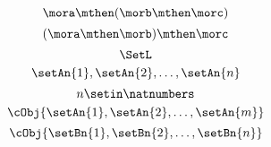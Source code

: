 \begin{forslides}
    \begin{equation}
        \label{eq:moore-assoc-a-bis}
        \mora \mthen (\morb \mthen \morc)
    \end{equation}
    \begin{equation}
        \label{eq:moore-assoc-b-bis}
        (\mora \mthen \morb) \mthen \morc
    \end{equation}
    \begin{equation}
        \label{eq:lset}
        \SetL
    \end{equation}
    \begin{equation}
        \label{eq:definition-setl}
        \setAn{1}, \setAn{2}, \ldots, \setAn{n}
    \end{equation}
    \begin{equation}
        \label{eq:definition-setlbis}
        n\setin \natnumbers
    \end{equation}
    \begin{equation}
        \label{eq:mult-setl}
        \cObj{\setAn{1}, \setAn{2}, \ldots, \setAn{m}}
    \end{equation}
    \begin{equation}
        \label{eq:mult-setlb}
        \cObj{\setBn{1}, \setBn{2}, \ldots, \setBn{n}}
    \end{equation}
\end{forslides}
